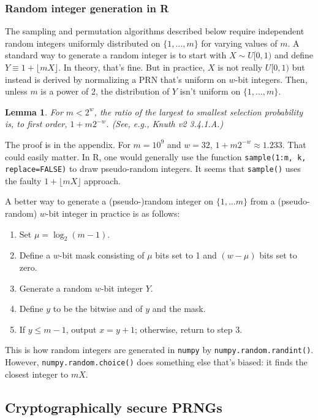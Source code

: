 \documentclass[12pt]{article}
\newtheorem{lemma}[theorem]{Lemma}
\begin{document}
\subsubsection{Random integer generation in R}
The sampling and permutation algorithms described below require independent random integers
uniformly distributed on $\{1, \dots, m\}$ for varying values of $m$.
A standard way to generate a random integer is to start with $X \sim U[0,1)$ and define $Y \equiv 1 + \lfloor mX \rfloor$. 
In theory, that's fine. 
But in practice, $X$ is not really $U[0,1)$ but instead is derived by normalizing a PRN that's uniform on $w$-bit integers. 
Then, unless $m$ is a power of 2, the distribution of $Y$ isn't uniform on $\{1, \ldots, m\}$. 

\begin{lemma}\label{lemma:randint}
For $m < 2^w$, the ratio of the largest to smallest selection probability is, to first order,  $1+ m 2^{-w}$. (See, e.g., Knuth v2 3.4.1.A.)
\end{lemma}

The proof is in the appendix.
For $m = 10^9$ and $w=32$, $1 + m 2^{-w} \approx 1.233$. That could easily matter.
In R, one would generally use the function \texttt{sample(1:m, k, replace=FALSE)} to draw pseudo-random integers. 
It seems that \texttt{sample()} uses the faulty $1 + \lfloor mX\rfloor$ approach.

A better way to generate a (pseudo-)random integer on $\{1, \ldots m\}$ from a (pseudo-random) $w$-bit integer in practice is as follows:
\begin{enumerate}
\item Set $\mu = \log_2(m-1)$.
\item Define a $w$-bit mask consisting of $\mu$ bits set to 1 and $(w-\mu)$ bits set to zero.
\item Generate a random $w$-bit integer $Y$.
\item Define $y$ to be the bitwise and of $y$ and the mask.
\item If $y \le m-1$, output $x = y+1$; otherwise, return to step 3.
\end{enumerate}
This is how random integers are generated in \texttt{numpy} by \texttt{numpy.random.randint()}. 
However, \texttt{numpy.random.choice()} does something else that's biased: it finds the closest integer to $mX$.

\subsection{Cryptographically secure PRNGs}
\end{document}
